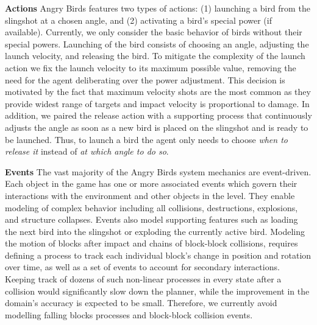 \documentclass[letterpaper]{article}
\begin{document}
\noindent\textbf{Actions}
Angry Birds features two types of actions: (1) launching a bird from the slingshot at a chosen angle, and (2) activating a bird's special power (if available).
Currently, we only consider the basic behavior of birds without their special powers.
Launching of the bird consists of
choosing an angle, adjusting the launch velocity, and releasing the bird.
To mitigate the complexity of the launch action we fix the launch velocity to its maximum possible value, removing the need for the agent deliberating over the power adjustment.
This decision is motivated by the fact that maximum velocity shots are the most common as they provide widest range of targets and impact velocity is proportional to damage.
In addition, we paired the release action with a supporting process that continuously adjusts the angle as soon as a new bird is placed on the slingshot and is ready to be launched.
Thus, to launch a bird the agent only needs to choose \textit{when to release it} instead of \textit{at which angle to do so}.















\noindent\textbf{Events}
The vast majority of the Angry Birds system mechanics are event-driven.
Each object in the game has one or more associated events which govern their interactions with the environment and other objects in the level.
They enable modeling of complex behavior including all collisions, destructions, explosions, and structure collapses. Events also model supporting features such as loading the next bird into the slingshot or exploding the currently active bird.
Modeling the motion of blocks after impact and chains of block-block collisions, requires defining a process to track each individual block's change in position and rotation over time, as well as a set of events to account for secondary interactions.
Keeping track of dozens of such non-linear processes in every state after a collision would significantly slow down the planner, while the improvement in the domain's accuracy is expected to be small.
Therefore, we currently avoid modelling falling blocks processes and block-block collision events. %
\end{document}
